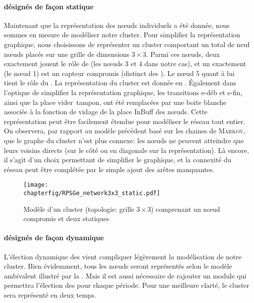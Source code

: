             \paragraph{\cns désignés de façon statique}
Maintenant que la représentation des nœuds individuels a été donnée, nous sommes en mesure de modéliser notre cluster.
Pour simplifier la représentation graphique, nous choisissons de représenter un cluster comportant un total de neuf nœuds placés sur une grille de dimensions $3\times3$.
Parmi ces nœuds, deux exactement jouent le rôle de \cn (les nœuds \textsf{3} et \textsf{4} dans notre cas), et un exactement (le nœud \textsf{1}) est un capteur compromis (distinct des \cns).
Le nœud \textsf{5} quant à lui tient le rôle du \ch.
La représentation du cluster est donnée en .
Également dans l'optique de simplifier la représentation graphique, les transitions \textsf{e-déb} et \textsf{e-fin}, ainsi que la place \textsf{vider~tampon}, ont été remplacées par une boite blanche associée à la fonction de vidage de la place \textsf{InBuff} des nœuds.
Cette représentation peut être facilement étendue pour modéliser le réseau tout entier.
On observera, par rapport au modèle précédent basé sur les chaines de \textsc{Markov}, que le graphe du cluster n'est plus connexe: les nœuds ne peuvent atteindre que leurs voisins directs (sur le côté ou en diagonale sur la représentation).
Là encore, il s'agit d'un choix permettant de simplifier le graphique, et la connexité du réseau peut être complétée par le simple ajout des arêtes manquantes.
\begin{figure}[!ht]
    \centering
    \texttt{[image: \\chapterfig/RPSGe\_network3x3\_static.pdf]}
    \caption{Modèle \rpsge d'un cluster (topologie: grille $3\times3$) comprenant un nœud compromis et deux \cns statiques}\label{sa:fig:petricluster}
\end{figure}

            \paragraph{\cns désignés de façon dynamique}
L'élection dynamique des \cns vient compliquer légèrement la modélisation de notre cluster.
Bien évidemment, tous les nœuds seront représentés selon le modèle ambivalent illustré par la .
Mais il est aussi nécessaire de rajouter un module qui permettra l'élection des \cns pour chaque période.
Pour une meilleure clarté, le cluster sera représenté en deux temps.

